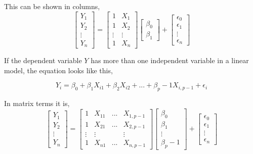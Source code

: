 This can be shown in columns,
$$
\left[
\begin{array}{c}
	Y_1 \\ 
	Y_2 \\ 
	\vdots \\
	Y_n 
\end{array}
\right]
=
\left[
\begin{array}{cc}
	1 & X_1 \\ 
	1 & X_2 \\ 
	\vdots & \vdots \\
	1 & X_n
\end{array}
\right]
\left[
\begin{array}{c}
	\beta_0 \\ 
	\beta_1 
\end{array}
\right]
+
\left[
\begin{array}{c}
	\epsilon_0 \\ 
	\epsilon_1 \\
	\vdots \\
	\epsilon_n 
\end{array}
\right]
$$

If the dependent variable $Y$ has more than one independent variable in a linear model, the equation looks like this, 

$$Y_i = \beta_0 + \beta_1 X_{i1} + \beta_2 X_{i2} + ... + \beta_p-1 X_{i, p-1} + \epsilon_i$$

In matrix terms it is,  
$$
\left[
\begin{array}{c}
	Y_1 \\ 
	Y_2 \\ 
	\vdots \\
	Y_n 
\end{array}
\right]
=
\left[
\begin{array}{cccc}
	1 & X_{11} & ... & X_{1, p-1} \\ 
	1 & X_{21} & ... & X_{2, p-1} \\ 
	\vdots & \vdots &  & \vdots \\
	1 & X_{n1} & ... & X_{n, p-1}
\end{array}
\right]
\left[
\begin{array}{c}
	\beta_0 \\ 
	\beta_1 \\
	\vdots \\
	\beta_p-1 
\end{array}
\right]
+
\left[
\begin{array}{c}
	\epsilon_0 \\ 
	\epsilon_1 \\
	\vdots \\
	\epsilon_n 
\end{array}
\right]
$$

